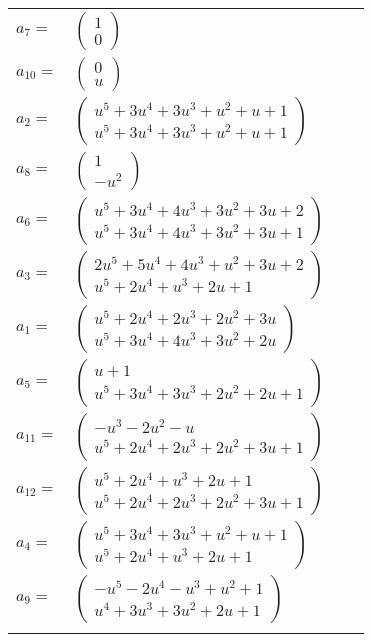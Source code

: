 \documentclass[1p]{elsarticle_modified}
\theoremstyle{definition}
\begin{document}
\begin{tabular}{m{7pt} m{180pt} m{7pt} m{180pt} }
\flushright $a_{7}=$&$\begin{pmatrix}1\\0\end{pmatrix}$ \\
\flushright $a_{10}=$&$\begin{pmatrix}0\\u\end{pmatrix}$ \\
\flushright $a_{2}=$&$\begin{pmatrix}u^5+3 u^4+3 u^3+u^2+u+1\\u^5+3 u^4+3 u^3+u^2+u+1\end{pmatrix}$ \\
\flushright $a_{8}=$&$\begin{pmatrix}1\\- u^2\end{pmatrix}$ \\
\flushright $a_{6}=$&$\begin{pmatrix}u^5+3 u^4+4 u^3+3 u^2+3 u+2\\u^5+3 u^4+4 u^3+3 u^2+3 u+1\end{pmatrix}$ \\
\flushright $a_{3}=$&$\begin{pmatrix}2 u^5+5 u^4+4 u^3+u^2+3 u+2\\u^5+2 u^4+u^3+2 u+1\end{pmatrix}$ \\
\flushright $a_{1}=$&$\begin{pmatrix}u^5+2 u^4+2 u^3+2 u^2+3 u\\u^5+3 u^4+4 u^3+3 u^2+2 u\end{pmatrix}$ \\
\flushright $a_{5}=$&$\begin{pmatrix}u+1\\u^5+3 u^4+3 u^3+2 u^2+2 u+1\end{pmatrix}$ \\
\flushright $a_{11}=$&$\begin{pmatrix}- u^3-2 u^2- u\\u^5+2 u^4+2 u^3+2 u^2+3 u+1\end{pmatrix}$ \\
\flushright $a_{12}=$&$\begin{pmatrix}u^5+2 u^4+u^3+2 u+1\\u^5+2 u^4+2 u^3+2 u^2+3 u+1\end{pmatrix}$ \\
\flushright $a_{4}=$&$\begin{pmatrix}u^5+3 u^4+3 u^3+u^2+u+1\\u^5+2 u^4+u^3+2 u+1\end{pmatrix}$ \\
\flushright $a_{9}=$&$\begin{pmatrix}- u^5-2 u^4- u^3+u^2+1\\u^4+3 u^3+3 u^2+2 u+1\end{pmatrix}$\\&\end{tabular}
\end{document}
